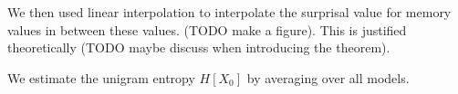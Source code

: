 \documentclass[11pt,letterpaper]{article}
\newcounter{theorem}
\begin{document}
We then used linear interpolation to interpolate the surprisal value for memory values in between these values. (TODO make a figure).
This is justified theoretically (TODO maybe discuss when introducing the theorem).

We estimate the unigram entropy $H[X_0]$ by averaging over all models.

%
%
%
%



\end{document}
